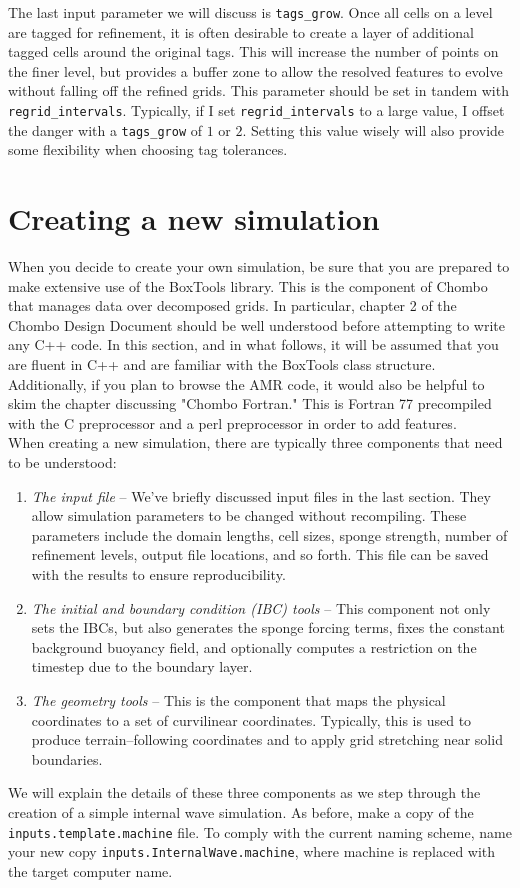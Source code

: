 \documentclass[12pt]{article}
\begin{document}
The last input parameter we will discuss is \texttt{tags\_grow}. Once all cells on a level are tagged for refinement, it is often desirable to create a layer of additional tagged cells around the original tags. This will increase the number of points on the finer level, but provides a buffer zone to allow the resolved features to evolve without falling off the refined grids. This parameter should be set in tandem with \texttt{regrid\_intervals}. Typically, if I set \texttt{regrid\_intervals} to a large value, I offset the danger with a \texttt{tags\_grow} of $1$ or $2$. Setting this value wisely will also provide some flexibility when choosing tag tolerances.

\section{Creating a new simulation}
When you decide to create your own simulation, be sure that you are prepared to make extensive use of the BoxTools library. This is the component of Chombo that manages data over decomposed grids. In particular, chapter 2 of the Chombo Design Document should be well understood before attempting to write any C++ code. In this section, and in what follows, it will be assumed that you are fluent in C++ and are familiar with the BoxTools class structure. Additionally, if you plan to browse the AMR code, it would also be helpful to skim the chapter discussing "Chombo Fortran." This is Fortran 77 precompiled with the C preprocessor and a perl preprocessor in order to add features.\\

When creating a new simulation, there are typically three components that need to be understood:
\begin{enumerate}
  \item \textit{The input file} -- We've briefly discussed input files in the last section. They allow simulation parameters to be changed without recompiling. These parameters include the domain lengths, cell sizes, sponge strength, number of refinement levels, output file locations, and so forth. This file can be saved with the results to ensure reproducibility.
  \item \textit{The initial and boundary condition (IBC) tools} -- This component not only sets the IBCs, but also generates the sponge forcing terms, fixes the constant background buoyancy field, and optionally computes a restriction on the timestep due to the boundary layer.
  \item \textit{The geometry tools} -- This is the component that maps the physical coordinates to a set of curvilinear coordinates. Typically, this is used to produce terrain--following coordinates and to apply grid stretching near solid boundaries.
\end{enumerate}
We will explain the details of these three components as we step through the creation of a simple internal wave simulation. As before, make a copy of the \texttt{inputs.template.machine} file. To comply with the current naming scheme, name your new copy \texttt{inputs.InternalWave.machine}, where machine is replaced with the target computer name.\\
\end{document}
